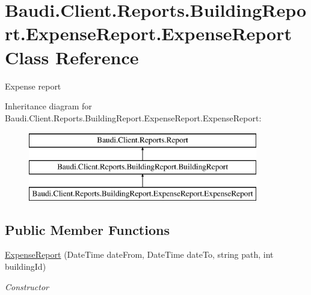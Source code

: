 \hypertarget{class_baudi_1_1_client_1_1_reports_1_1_building_report_1_1_expense_report_1_1_expense_report}{}\section{Baudi.\+Client.\+Reports.\+Building\+Report.\+Expense\+Report.\+Expense\+Report Class Reference}
\label{class_baudi_1_1_client_1_1_reports_1_1_building_report_1_1_expense_report_1_1_expense_report}


Expense report  


Inheritance diagram for Baudi.\+Client.\+Reports.\+Building\+Report.\+Expense\+Report.\+Expense\+Report\+:\begin{figure}[H]
\begin{center}
\leavevmode
\includegraphics[height=3.000000cm]{class_baudi_1_1_client_1_1_reports_1_1_building_report_1_1_expense_report_1_1_expense_report}
\end{center}
\end{figure}
\subsection*{Public Member Functions}
\begin{DoxyCompactItemize}
\item 
\hyperlink{class_baudi_1_1_client_1_1_reports_1_1_building_report_1_1_expense_report_1_1_expense_report_a7a48a52a906ad81ee040de78a4eea31e}{Expense\+Report} (Date\+Time date\+From, Date\+Time date\+To, string path, int building\+Id)
\begin{DoxyCompactList}\small\item\em Constructor \end{DoxyCompactList}\end{DoxyCompactItemize}
